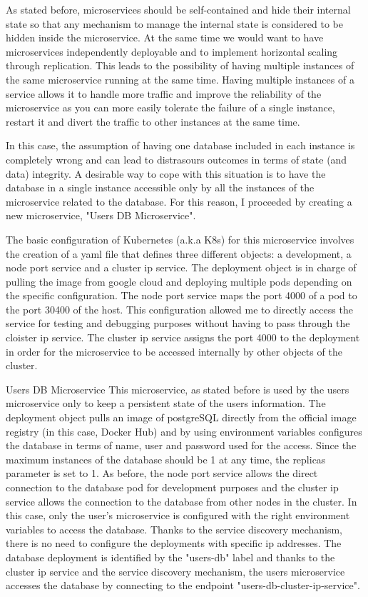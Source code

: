 \documentclass[sigplan,screen]{acmart}
\begin{document}
As stated before, microservices should be self-contained and hide their internal state so that any mechanism to manage the internal state is considered to be hidden inside the microservice. At the same time we would want to have microservices independently deployable and to implement horizontal scaling through replication. This leads to the possibility of having multiple instances of the same microservice running at the same time.
Having multiple instances of a service allows it to handle more traffic and improve the reliability of the microservice as you can more easily tolerate the failure of a single instance, restart it and divert the traffic to other instances at the same time.

In this case, the assumption of having one database included in each instance is completely wrong and can lead to distrasours outcomes in terms of state (and data) integrity. A desirable way to cope with this situation is to have the database in a single instance accessible only by all the instances of the microservice related to the database. For this reason, I proceeded by creating a new microservice, "Users DB Microservice".

The basic configuration of Kubernetes (a.k.a K8s) for this microservice involves the creation of a yaml file that defines three different objects: a development, a node port service and a cluster ip service. The deployment object is in charge of pulling the image from google cloud and deploying multiple pods depending on the specific configuration. The node port service maps the port 4000 of a pod to the port 30400 of the host. This configuration allowed me to directly access the service for testing and debugging purposes without having to pass through the cloister ip service. The cluster ip service assigns the port 4000 to the deployment in order for the microservice to be accessed internally by other objects of the cluster.

Users DB Microservice
This microservice, as stated before is used by the users microservice only to keep a persistent state of the users information. The deployment object pulls an image of postgreSQL directly from the official image registry (in this case, Docker Hub) and by using environment variables configures the database in terms of name, user and password used for the access. Since the maximum instances of the database should be 1 at any time, the replicas parameter is set to 1. As before, the node port service allows the direct connection to the database pod for development purposes and the cluster ip service allows the connection to the database from other nodes in the cluster. In this case, only the user's microservice is configured with the right environment variables to access the database. Thanks to the service discovery mechanism, there is no need to configure the deployments with specific ip addresses. The database deployment is identified by the "users-db" label and thanks to the cluster ip service and the service discovery mechanism, the users microservice accesses the database by connecting to the endpoint "users-db-cluster-ip-service".
\end{document}

